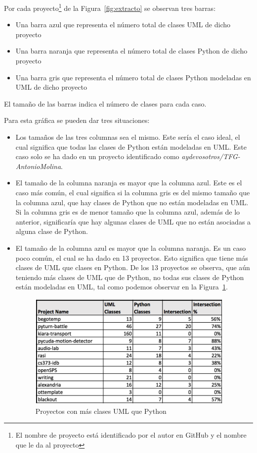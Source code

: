 \documentclass[a4paper, 12pt]{book}
\begin{document}
Por cada proyecto\footnote{El nombre de proyecto está identificado
por el autor en GitHub y el nombre que le da al proyecto} de la Figura~\ref{fig:extracto} se observan tres barras:
\begin{itemize}
  \item Una barra azul que representa el número total de clases UML de dicho proyecto
  \item Una barra naranja que representa el número total de clases Python de dicho proyecto
  \item Una barra gris que representa el número total de clases Python modeladas en UML de dicho proyecto
\end{itemize}

El tamaño de las barras indica el número de clases para cada caso.

Para esta gráfica se pueden dar tres situaciones:
\begin{itemize}
  \item Los tamaños de las tres columnas sea el mismo. Este sería el caso ideal, el cual significa que todas
  las clases de Python están modeladas en UML. Este caso solo se ha dado en un proyecto identificado como
  \textit{aydevosotros/TFG-AntonioMolina}.
  \item El tamaño de la columna naranja es mayor que la columna azul. Este es el caso más común, el cual significa
  si la columna gris es del mismo tamaño que la columna azul, que hay clases de Python que no están modeladas en UML.
  Si la columna gris es de menor tamaño que la columna azul, además de lo anterior, significaría que hay algunas clases de UML
  que no están asociadas a alguna clase de Python.
  \item El tamaño de la columna azul es mayor que la columna naranja. Es un caso poco común, el cual se ha dado en
  13 proyectos. Esto significa que tiene más clases de UML que clases en Python. De los 13 proyectos se observa,
  que aún teniendo más clases de UML que de Python, no todas sus clases de Python están modeladas en UML, tal como podemos
  observar en la Figura~\ref{fig:listamasuml}.

  \begin{figure}[htb]
    \centering
    \includegraphics[width=10cm, keepaspectratio]{img/GraficasResultados/listamasuml}
    \caption{Proyectos con más clases UML que Python}
    \label{fig:listamasuml}
  \end{figure}
\end{itemize}
\end{document}
